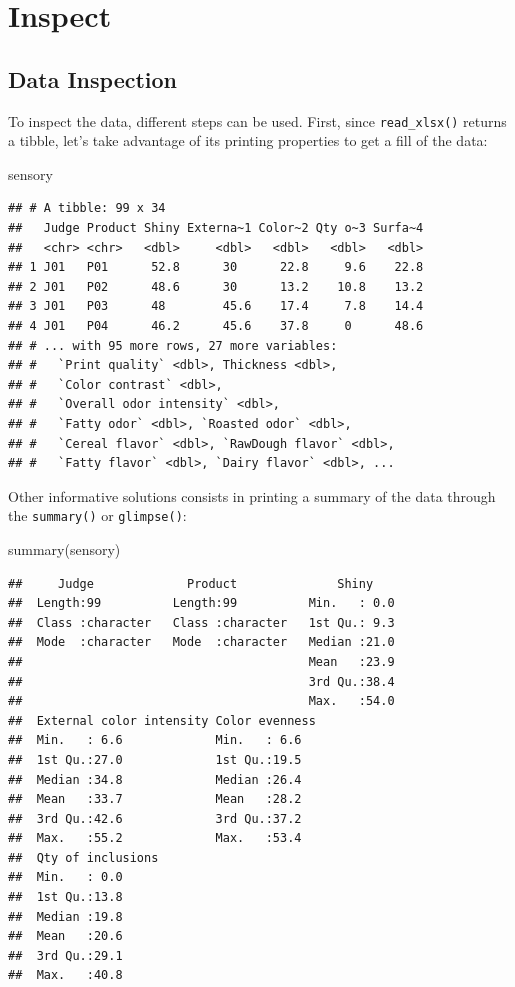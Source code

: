 \documentclass[
]{krantz}
\makeatletter
\newenvironment{Shaded}{\begin{snugshade}}{\end{snugshade}}
\newcommand{\FunctionTok}[1]{\textcolor[rgb]{0,0,0}{#1}}
\newcommand{\NormalTok}[1]{#1}
\newenvironment{kframe}{%
\medskip{}
\setlength{\fboxsep}{.8em}
 \def\at@end@of@kframe{}%
 \ifinner\ifhmode%
  \def\at@end@of@kframe{\end{minipage}}%
  \begin{minipage}{\columnwidth}%
 \fi\fi%
 \def\FrameCommand##1{\hskip\@totalleftmargin \hskip-\fboxsep
 \colorbox{shadecolor}{##1}\hskip-\fboxsep
     \hskip-\linewidth \hskip-\@totalleftmargin \hskip\columnwidth}%
 \MakeFramed {\advance\hsize-\width
   \@totalleftmargin\z@ \linewidth\hsize
   \@setminipage}}%
 {\par\unskip\endMakeFramed%
 \at@end@of@kframe}
\renewenvironment{Shaded}{\begin{kframe}}{\end{kframe}}
\makeatother
\begin{document}
\hypertarget{inspect}{%
\section{Inspect}\label{inspect}}

\hypertarget{data-inspection}{%
\subsection{Data Inspection}\label{data-inspection}}

To inspect the data, different steps can be used.
First, since \texttt{read\_xlsx()} returns a tibble, let's take advantage of its printing properties to get a fill of the data:

\begin{Shaded}
\begin{Highlighting}[]
\NormalTok{sensory}
\end{Highlighting}
\end{Shaded}

\begin{verbatim}
## # A tibble: 99 x 34
##   Judge Product Shiny Externa~1 Color~2 Qty o~3 Surfa~4
##   <chr> <chr>   <dbl>     <dbl>   <dbl>   <dbl>   <dbl>
## 1 J01   P01      52.8      30      22.8     9.6    22.8
## 2 J01   P02      48.6      30      13.2    10.8    13.2
## 3 J01   P03      48        45.6    17.4     7.8    14.4
## 4 J01   P04      46.2      45.6    37.8     0      48.6
## # ... with 95 more rows, 27 more variables:
## #   `Print quality` <dbl>, Thickness <dbl>,
## #   `Color contrast` <dbl>,
## #   `Overall odor intensity` <dbl>,
## #   `Fatty odor` <dbl>, `Roasted odor` <dbl>,
## #   `Cereal flavor` <dbl>, `RawDough flavor` <dbl>,
## #   `Fatty flavor` <dbl>, `Dairy flavor` <dbl>, ...
\end{verbatim}

Other informative solutions consists in printing a summary of the data through the \texttt{summary()} or \texttt{glimpse()}:

\begin{Shaded}
\begin{Highlighting}[]
\FunctionTok{summary}\NormalTok{(sensory)}
\end{Highlighting}
\end{Shaded}

\begin{verbatim}
##     Judge             Product              Shiny     
##  Length:99          Length:99          Min.   : 0.0  
##  Class :character   Class :character   1st Qu.: 9.3  
##  Mode  :character   Mode  :character   Median :21.0  
##                                        Mean   :23.9  
##                                        3rd Qu.:38.4  
##                                        Max.   :54.0  
##  External color intensity Color evenness
##  Min.   : 6.6             Min.   : 6.6  
##  1st Qu.:27.0             1st Qu.:19.5  
##  Median :34.8             Median :26.4  
##  Mean   :33.7             Mean   :28.2  
##  3rd Qu.:42.6             3rd Qu.:37.2  
##  Max.   :55.2             Max.   :53.4  
##  Qty of inclusions
##  Min.   : 0.0     
##  1st Qu.:13.8     
##  Median :19.8     
##  Mean   :20.6     
##  3rd Qu.:29.1     
##  Max.   :40.8
\end{verbatim}
\end{document}
